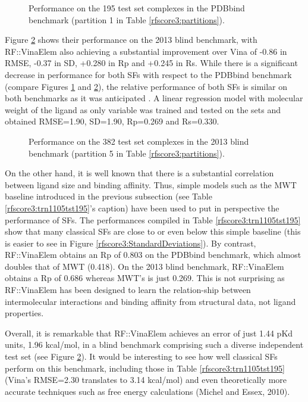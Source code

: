 \begin{figure}
\centering
{}
\caption{Performance on the 195 test set complexes in the PDBbind benchmark (partition 1 in Table \ref{rfscore3:partitions}).}
\label{rfscore3:partition1stat}
\end{figure}

Figure \ref{rfscore3:partition5stat} shows their performance on the 2013 blind benchmark, with RF::VinaElem also achieving a substantial improvement over Vina of -0.86 in RMSE, -0.37 in SD, +0.280 in Rp and +0.245 in Rs. While there is a significant decrease in performance for both SFs with respect to the PDBbind benchmark (compare Figures \ref{rfscore3:partition1stat} and \ref{rfscore3:partition5stat}), the relative performance of both SFs is similar on both benchmarks as it was anticipated \citep{908}. A linear regression model with molecular weight of the ligand as only variable was trained and tested on the sets and obtained RMSE=1.90, SD=1.90, Rp=0.269 and Rs=0.330.

\begin{figure}
\centering
{}
\caption{Performance on the 382 test set complexes in the 2013 blind benchmark (partition 5 in Table \ref{rfscore3:partitions}).}
\label{rfscore3:partition5stat}
\end{figure}

On the other hand, it is well known that there is a substantial correlation between ligand size and binding affinity. Thus, simple models such as the MWT baseline introduced in the previous subsection (see Table \ref{rfscore3:trn1105tst195}'s caption) have been used to put in perspective the performance of SFs. The performances compiled in Table \ref{rfscore3:trn1105tst195} show that many classical SFs are close to or even below this simple baseline (this is easier to see in Figure \ref{rfscore3:StandardDeviations}). By contrast, RF::VinaElem obtains an Rp of 0.803 on the PDBbind benchmark, which almost doubles that of MWT (0.418). On the 2013 blind benchmark, RF::VinaElem obtains a Rp of 0.686 whereas MWT's is just 0.269. This is not surprising as RF::VinaElem has been designed to learn the relation-ship between intermolecular interactions and binding affinity from structural data, not ligand properties. 

Overall, it is remarkable that RF::VinaElem achieves an error of just 1.44 pKd units, 1.96 kcal/mol, in a blind benchmark comprising such a diverse independent test set (see Figure \ref{rfscore3:partition5stat}). It would be interesting to see how well classical SFs perform on this benchmark, including those in Table \ref{rfscore3:trn1105tst195} (Vina's RMSE=2.30 translates to 3.14 kcal/mol) and even theoretically more accurate techniques such as free energy calculations (Michel and Essex, 2010).

